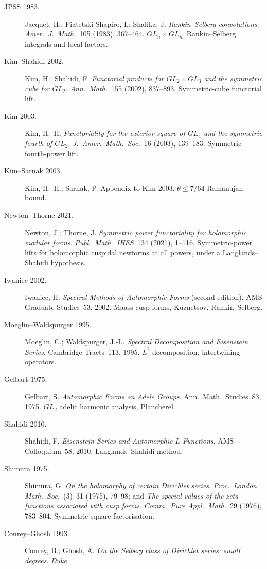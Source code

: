 \begin{description}
\item[JPSS 1983.] Jacquet, H.; Piatetski-Shapiro, I.; Shalika, J.
\emph{Rankin--Selberg convolutions}. \emph{Amer.~J.~Math.}~105
(1983), 367--464. \(GL_{n}\times GL_{m}\) Rankin--Selberg integrals and
local factors.
\item[Kim--Shahidi 2002.] Kim, H.; Shahidi, F. \emph{Functorial
products for \(GL_{2}\times GL_{3}\) and the symmetric cube for
\(GL_{2}\)}. \emph{Ann.~Math.}~155 (2002), 837--893. Symmetric-cube
functorial lift.
\item[Kim 2003.] Kim, H.~H. \emph{Functoriality for the exterior
square of \(GL_{4}\) and the symmetric fourth of \(GL_{2}\)}.
\emph{J.~Amer.~Math.~Soc.}~16 (2003), 139--183. Symmetric-fourth-power
lift.
\item[Kim--Sarnak 2003.] Kim, H.~H.; Sarnak, P. Appendix to Kim 2003.
\(\theta\leq 7/64\) Ramanujan bound.
\item[Newton--Thorne 2021.] Newton, J.; Thorne, J.
\emph{Symmetric power functoriality for holomorphic modular forms}.
\emph{Publ.~Math.~IHES}~134 (2021), 1--116. Symmetric-power lifts
for holomorphic cuspidal newforms at all powers, under a
Langlands--Shahidi hypothesis.
\item[Iwaniec 2002.] Iwaniec, H. \emph{Spectral Methods of
Automorphic Forms} (second edition). AMS Graduate Studies~53, 2002.
Maass cusp forms, Kuznetsov, Rankin--Selberg.
\item[Moeglin--Waldspurger 1995.] Moeglin, C.; Waldspurger, J.-L.
\emph{Spectral Decomposition and Eisenstein Series}. Cambridge
Tracts~113, 1995. \(L^{2}\)-decomposition, intertwining operators.
\item[Gelbart 1975.] Gelbart, S. \emph{Automorphic Forms on Adele
Groups}. Ann.~Math.~Studies~83, 1975. \(GL_{2}\) adelic harmonic
analysis, Plancherel.
\item[Shahidi 2010.] Shahidi, F. \emph{Eisenstein Series and
Automorphic \(L\)-Functions}. AMS Colloquium~58, 2010.
Langlands--Shahidi method.
\item[Shimura 1975.] Shimura, G. \emph{On the holomorphy of certain
Dirichlet series}. \emph{Proc.~London Math.~Soc.}~(3)~31 (1975),
79--98; and \emph{The special values of the zeta functions associated
with cusp forms}. \emph{Comm.~Pure Appl.~Math.}~29 (1976), 783--804.
Symmetric-square factorisation.
\item[Conrey--Ghosh 1993.] Conrey, B.; Ghosh, A. \emph{On the
Selberg class of Dirichlet series: small degrees}. \emph{Duke
}
\end{description}
